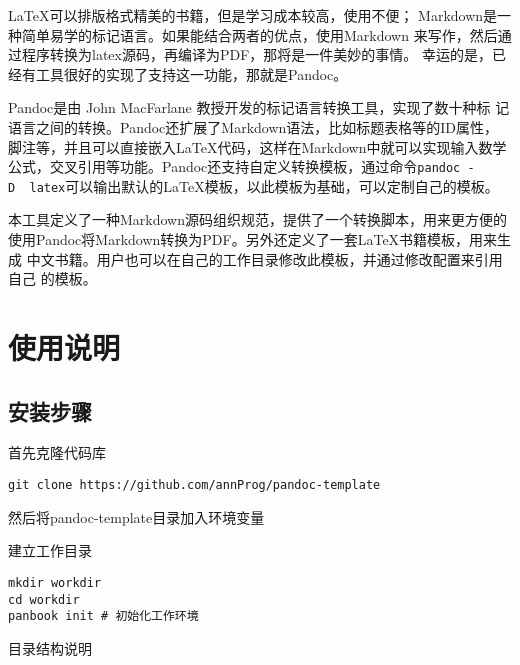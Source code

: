 \documentclass[fancyhdr,bookmark]{ctexbook}
\begin{document}
LaTeX可以排版格式精美的书籍，但是学习成本较高，使用不便；
Markdown是一种简单易学的标记语言。如果能结合两者的优点，使用Markdown
来写作，然后通过程序转换为latex源码，再编译为PDF，那将是一件美妙的事情。
幸运的是，已经有工具很好的实现了支持这一功能，那就是Pandoc。

Pandoc是由 John MacFarlane 教授开发的标记语言转换工具，实现了数十种标
记语言之间的转换。Pandoc还扩展了Markdown语法，比如标题表格等的ID属性，
脚注等，并且可以直接嵌入LaTeX代码，这样在Markdown中就可以实现输入数学
公式，交叉引用等功能。Pandoc还支持自定义转换模板，通过命令\texttt{pandoc\ -D\ \ latex}可以输出默认的LaTeX模板，以此模板为基础，可以定制自己的模板。

本工具定义了一种Markdown源码组织规范，提供了一个转换脚本，用来更方便的
使用Pandoc将Markdown转换为PDF。另外还定义了一套LaTeX书籍模板，用来生成
中文书籍。用户也可以在自己的工作目录修改此模板，并通过修改配置来引用自己
的模板。


{
\hypersetup{linkcolor=black}
\setcounter{tocdepth}{2}
\tableofcontents
{}
}
\listoftables
{}
\listoffigures
{}



\mainmatter
\hypertarget{ux4f7fux7528ux8bf4ux660e}{%
\chapter{使用说明}\label{ux4f7fux7528ux8bf4ux660e}}

\hypertarget{ux5b89ux88c5ux6b65ux9aa4}{%
\section{安装步骤}\label{ux5b89ux88c5ux6b65ux9aa4}}

首先克隆代码库

\begin{lstlisting}
git clone https://github.com/annProg/pandoc-template
\end{lstlisting}

然后将pandoc-template目录加入环境变量

建立工作目录

\begin{lstlisting}
mkdir workdir
cd workdir
panbook init # 初始化工作环境
\end{lstlisting}

目录结构说明
\end{document}
